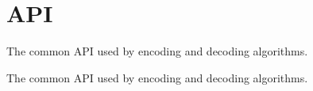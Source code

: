 \hypertarget{group__codec__api}{\section{A\-P\-I}
\label{group__codec__api}
}


The common A\-P\-I used by encoding and decoding algorithms.  


The common A\-P\-I used by encoding and decoding algorithms. 